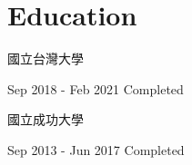 \section{Education}

	{\begin{CJK*}{UTF8}{bsmi}國立台灣大學\end{CJK*}}
	{Sep 2018 - Feb 2021}
	{Completed}

	{\begin{CJK*}{UTF8}{bsmi}國立成功大學\end{CJK*}}
	{Sep 2013 - Jun 2017}
	{Completed}

